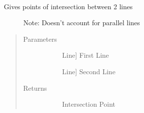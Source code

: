 \documentclass[letterpaper,10pt,english]{sphinxmanual}
\begin{document}
\begin{fulllineitems}
\label{\detokenize{geometryReco:geometryReco.lineIntersection}}~\begin{description}
\item[{Gives points of intersection between 2 lines}] \leavevmode
Note: Doesn’t account for parallel lines

\end{description}
\begin{quote}\begin{description}
\item[{Parameters}] \leavevmode\begin{description}
\item[{}] \leavevmode{[}Line{]}
First Line

\item[{}] \leavevmode{[}Line{]}
Second Line

\end{description}

\item[{Returns}] \leavevmode\begin{description}
\item[{}] \leavevmode
Intersection Point

\end{description}

\end{description}\end{quote}

\end{fulllineitems}

\end{document}

